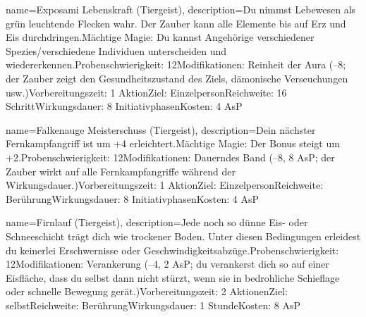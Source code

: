 {
    name={Exposami Lebenskraft (Tiergeist)},
    description={Du nimmst Lebewesen als grün leuchtende Flecken wahr. Der Zauber kann alle Elemente bis auf Erz und Eis durchdringen.\newline Mächtige Magie: Du kannst Angehörige verschiedener Spezies/verschiedene Individuen unterscheiden und wiedererkennen.\newline Probenschwierigkeit: 12\newline Modifikationen: Reinheit der Aura (–8; der Zauber zeigt den Gesundheitszustand des Ziels, dämonische Verseuchungen usw.)\newline Vorbereitungszeit: 1 Aktion\newline Ziel: Einzelperson\newline Reichweite: 16 Schritt\newline Wirkungsdauer: 8 Initiativphasen\newline Kosten: 4 AsP}
}


{
    name={Falkenauge Meisterschuss (Tiergeist)},
    description={Dein nächster Fernkampfangriff ist um +4 erleichtert.\newline Mächtige Magie: Der Bonus steigt um +2.\newline Probenschwierigkeit: 12\newline Modifikationen: Dauerndes Band (–8, 8 AsP; der Zauber wirkt auf alle Fernkampfangriffe während der Wirkungsdauer.)\newline Vorbereitungszeit: 1 Aktion\newline Ziel: Einzelperson\newline Reichweite: Berührung\newline Wirkungsdauer: 8 Initiativphasen\newline Kosten: 4 AsP}
}


{
    name={Firnlauf (Tiergeist)},
    description={Jede noch so dünne Eis- oder Schneeschicht trägt dich wie trockener Boden. Unter diesen Bedingungen erleidest du keinerlei Erschwernisse oder Geschwindigkeitsabzüge.\newline Probenschwierigkeit: 12\newline Modifikationen: Verankerung (–4, 2 AsP; du verankerst dich so auf einer Eisfläche, dass du selbst dann nicht stürzt, wenn sie in bedrohliche Schieflage oder schnelle Bewegung gerät.)\newline Vorbereitungszeit: 2 Aktionen\newline Ziel: selbst\newline Reichweite: Berührung\newline Wirkungsdauer: 1 Stunde\newline Kosten: 8 AsP}
}


